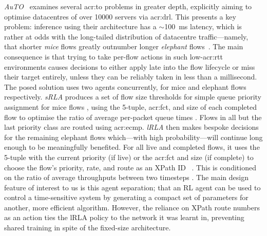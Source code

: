 \emph{AuTO}~\parencite{DBLP:conf/sigcomm/ChenL0L18} examines several \gls{acr:to} problems in greater depth, explicitly aiming to optimise datacentres of over \num{10000} servers via \gls{acr:drl}.
This presents a key problem: inference using their architecture has a $\sim$\qty{100}{\milli\second} latency, which is rather at odds with the long-tailed distribution of datacentre traffic---namely, that shorter \emph{mice} flows greatly outnumber longer \emph{elephant} flows~\parencite{DBLP:journals/ccr/PanBPS03}.
The main consequence is that trying to take per-flow actions in such low-\gls{acr:rtt} environments causes decisions to either apply late into the flow lifecycle or miss their target entirely, unless they can be reliably taken in less than a millisecond.
The posed solution uses two agents concurrently, for mice and elephant flows respectively.
\emph{sRLA} produces a set of flow size thresholds for simple queue priority assignment for mice flows \prllitactreal, using the 5-tuple, \gls{acr:fct}, and size of each completed flow \prllitstate{} to optimise the ratio of average per-packet queue times \prllitreward.
Flows in all but the last priority class are routed using \gls{acr:ecmp}.
\emph{lRLA} then makes bespoke decisions for the remaining elephant flows which---with high probability---will continue long enough to be meaningfully benefited.
For all live and completed flows, it uses the 5-tuple with the current priority (if live) or the \gls{acr:fct} and size (if complete) \prllitstate{} to choose the flow's priority, rate, and route as an XPath ID~\parencite{DBLP:journals/ton/Hu0W0L0ZG16} \parenglance{$\rllitactraw\times\rllitactrealraw$}.
This is conditioned on the ratio of average throughputs between two timesteps \prllitreward.
The main design feature of interest to us is this agent separation; that an RL agent can be used to control a time-sensitive system by generating a compact set of parameters for another, more efficient algorithm.
However, the reliance on XPath route numbers as an action ties the lRLA policy to the network it was learnt in, preventing shared training in spite of the fixed-size architecture.

